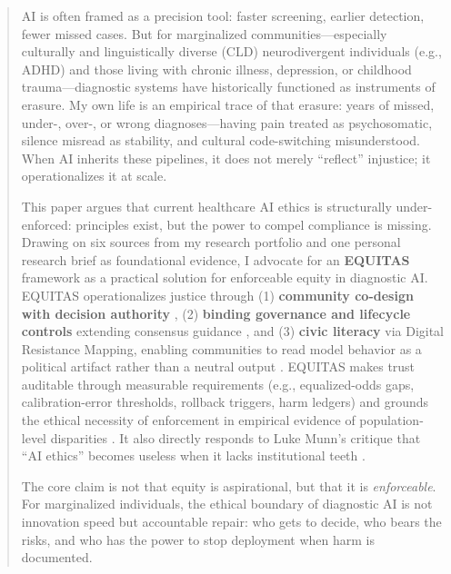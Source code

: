 \documentclass[12pt,a4paper]{article}
\begin{document}
\clearpage


\begin{abstract}
\noindent
AI is often framed as a precision tool: faster screening, earlier detection, fewer missed cases. But for marginalized communities—especially culturally and linguistically diverse (CLD) neurodivergent individuals (e.g., ADHD) and those living with chronic illness, depression, or childhood trauma—diagnostic systems have historically functioned as instruments of erasure. My own life is an empirical trace of that erasure: years of missed, under-, over-, or wrong diagnoses—having pain treated as psychosomatic, silence misread as stability, and cultural code-switching misunderstood. When AI inherits these pipelines, it does not merely ``reflect'' injustice; it operationalizes it at scale.

\vspace{0.5cm}
This paper argues that current healthcare AI ethics is structurally under-enforced: principles exist, but the power to compel compliance is missing. Drawing on six sources from my research portfolio and one personal research brief as foundational evidence, I advocate for an \textbf{EQUITAS} framework as a practical solution for enforceable equity in diagnostic AI. EQUITAS operationalizes justice through (1) \textbf{community co-design with decision authority} \citep{Nadarzynski2024}, (2) \textbf{binding governance and lifecycle controls} extending consensus guidance \citep{Lekadir2025}, and (3) \textbf{civic literacy} via Digital Resistance Mapping, enabling communities to read model behavior as a political artifact rather than a neutral output \citep{SocialJusticeStandards2018, Wiegand2020}. EQUITAS makes trust auditable through measurable requirements (e.g., equalized-odds gaps, calibration-error thresholds, rollback triggers, harm ledgers) \citep{Sagona2025, Chen2023} and grounds the ethical necessity of enforcement in empirical evidence of population-level disparities \citep{Marko2025}. It also directly responds to Luke Munn’s critique that ``AI ethics'' becomes useless when it lacks institutional teeth \citep{Munn2023}.

\vspace{0.5cm}
The core claim is not that equity is aspirational, but that it is \emph{enforceable}. For marginalized individuals, the ethical boundary of diagnostic AI is not innovation speed but accountable repair: who gets to decide, who bears the risks, and who has the power to stop deployment when harm is documented.

\vfill
{}
\end{abstract}
\end{document}

